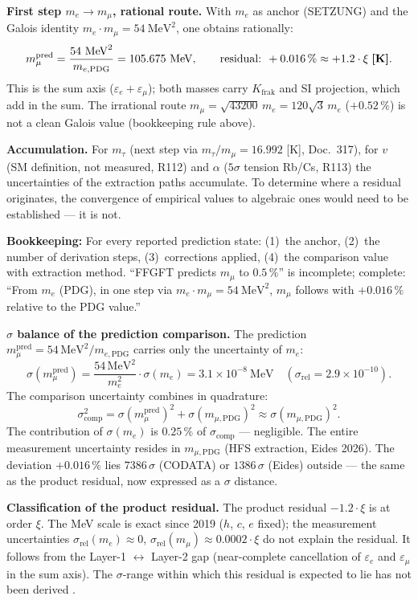 \textbf{First step $m_e\to m_\mu$, rational route.}
With $m_e$ as anchor (SETZUNG) and the Galois identity
$m_e\cdot m_\mu=54~\text{MeV}^2$, one obtains rationally:
\[
m_\mu^\text{pred} = \frac{54~\text{MeV}^2}{m_{e,\text{PDG}}}
= 105.675~\text{MeV},\qquad
\text{residual: }+0.016\,\%\approx+1.2\cdot\xi\;\textbf{[K]}.
\]
This is the sum axis ($\varepsilon_e+\varepsilon_\mu$); both masses carry
$K_\text{frak}$ and SI projection, which add in the sum.
The irrational route $m_\mu=\sqrt{43200}\,m_e=120\sqrt{3}\,m_e$
($+0.52\,\%$) is not a clean Galois value (bookkeeping rule above).

\textbf{Accumulation.} For $m_\tau$ (next step via $m_\tau/m_\mu=16.992$
[K], Doc.~317), for $v$ (SM definition, not measured, R112) and $\alpha$
($5\sigma$ tension Rb/Cs, R113) the uncertainties of the extraction paths
accumulate. To determine where a residual originates, the convergence of
empirical values to algebraic ones would need to be established --- it is not.

\textbf{Bookkeeping:} For every reported prediction state:
(1)~the anchor, (2)~the number of derivation steps, (3)~corrections applied,
(4)~the comparison value with extraction method.
``FFGFT predicts $m_\mu$ to $0.5\,\%$'' is incomplete; complete:
``From $m_e$ (PDG), in one step via $m_e\cdot m_\mu=54~\text{MeV}^2$,
$m_\mu$ follows with $+0.016\,\%$ relative to the PDG value.''


\textbf{$\sigma$ balance of the prediction comparison.}
The prediction $m_\mu^\text{pred}=54\,\text{MeV}^2/m_{e,\text{PDG}}$
carries only the uncertainty of $m_e$:
\[
\sigma(m_\mu^\text{pred}) = \frac{54\,\text{MeV}^2}{m_e^2}\cdot\sigma(m_e)
= 3.1\times10^{-8}~\text{MeV}\quad(\sigma_\text{rel}=2.9\times10^{-10}).
\]
The comparison uncertainty combines in quadrature:
\[
\sigma_\text{comp}^2 = \sigma(m_\mu^\text{pred})^2 + \sigma(m_{\mu,\text{PDG}})^2
\approx \sigma(m_{\mu,\text{PDG}})^2.
\]
The contribution of $\sigma(m_e)$ is $0.25\,\%$ of $\sigma_\text{comp}$ ---
negligible. The entire measurement uncertainty resides in
$m_{\mu,\text{PDG}}$ (HFS extraction, Eides 2026). The deviation
$+0.016\,\%$ lies
$7386\,\sigma$ (CODATA) or $1386\,\sigma$ (Eides) outside ---
the same as the product residual, now expressed as a $\sigma$ distance.


\textbf{Classification of the product residual.}
The product residual $-1.2\cdot\xi$ is at order $\xi$.
The MeV scale is exact since 2019 ($h$, $c$, $e$ fixed); the
measurement uncertainties $\sigma_\text{rel}(m_e)\approx0$,
$\sigma_\text{rel}(m_\mu)\approx0.0002\cdot\xi$ do not explain the residual.
It follows from the Layer-1 $\leftrightarrow$ Layer-2 gap (near-complete
cancellation of $\varepsilon_e$ and $\varepsilon_\mu$ in the sum axis).
The $\sigma$-range within which this residual is expected to lie
has not been derived \SM.



